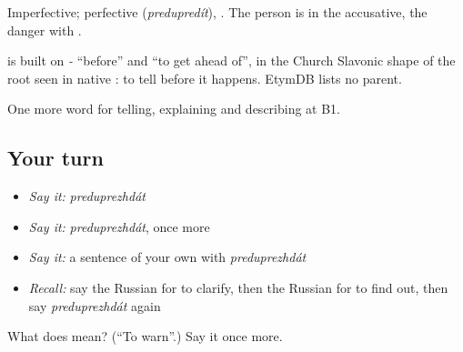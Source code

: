 Imperfective; perfective \emph{} (\emph{predupredít}), \emph{ }. The person is in the accusative, the danger with \emph{}.

\begin{cousinweb}
\emph{} is built on \emph{-} \textquotedblleft{}before\textquotedblright{} and \emph{} \textquotedblleft{}to get ahead of\textquotedblright{}, in the Church Slavonic shape of the root seen in native \emph{}: to tell before it happens. EtymDB lists no parent.
\end{cousinweb}

\begin{grammarlens}[title={What you've built}]
One more word for telling, explaining and describing at B1.
\end{grammarlens}

\subsection*{Your turn}
\begin{itemize}
\raggedright
  \item \emph{Say it:} \emph{preduprezhdát}
  \item \emph{Say it:} \emph{preduprezhdát}, once more
  \item \emph{Say it:} a sentence of your own with \emph{preduprezhdát}
  \item \emph{Recall:} say the Russian for to clarify, then the Russian for to find out, then say \emph{preduprezhdát} again
\end{itemize}

\begin{tcolorbox}[breakable,colback=teal!4,colframe=teal!35!black,title={Before you move on}]
What does  mean? (\textquotedblleft{}To warn\textquotedblright{}.) Say it once more.
\end{tcolorbox}
